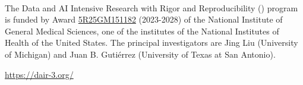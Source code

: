 \vfill

\noindent\textbf{\DAIR{}} \\

{\scriptsize

\noindent
The Data and AI Intensive Research with Rigor and Reproducibility (\DAIR) program is
funded by Award \href{https://reporter.nih.gov/project-details/10723223#history}{5R25GM151182} (2023-2028)
of the National Institute of General Medical Sciences, one of the institutes of the National
Institutes of Health of the United States.  The principal investigators are
Jing Liu (University of Michigan) and Juan B. Gutiérrez (University of Texas at San Antonio).

\vspace{0.1in}
\noindent
\href{https://dair-3.org/ }{https://dair-3.org/}

}
